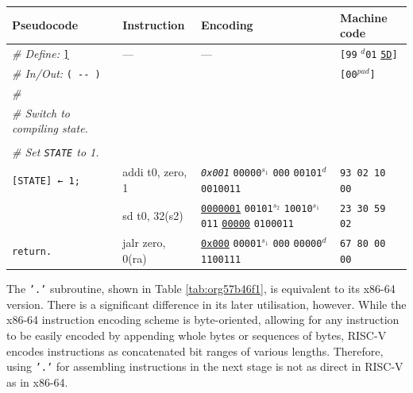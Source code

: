 \documentclass[a4paper,12pt,final]{article}
\begin{document}
\begin{table}[!htbp] \begin{adjustwidth}{-1cm}{-1cm} \fontsize{8}{9.600000}\selectfont
\begin{center}
\begin{tabular}{l|ll|l}
\textbf{Pseudocode} & \textbf{Instruction} & \textbf{Encoding} & \textbf{Machine code}\\[0pt]
\hline
\emph{\# Define:} \uline{\texttt{]}} & --- & --- & \texttt{[99} \(^{d}\)​\texttt{01} \uline{\texttt{5D}}​\texttt{]}\\[0pt]
\emph{\# In/Out:} \texttt{( -​- )} &  &  & \texttt{[00}​\(^{pad}\)​\texttt{]}\\[0pt]
\emph{\#} &  &  & \\[0pt]
\emph{\# Switch to compiling state.} &  &  & \\[0pt]
 &  &  & \\[0pt]
\emph{\# Set \texttt{STATE} to 1.} &  &  & \\[0pt]
\texttt{[STATE] ← 1;} & addi t0, zero, 1 & \emph{\texttt{0x001}}                    \texttt{00000}​\(^{s_{1}}\) \texttt{000} \texttt{00101}​\(^{d}\)  \texttt{0010011} & \texttt{93 02 10 00}\\[0pt]
 & sd t0, 32(s2) & \uline{\texttt{0000001}} \texttt{00101}​\(^{s_{2}}\) \texttt{10010}​\(^{s_{1}}\) \texttt{011} \uline{\texttt{00000}} \texttt{0100011} & \texttt{23 30 59 02}\\[0pt]
\texttt{return.} & jalr zero, 0(ra) & \uline{\texttt{0x000}}                    \texttt{00001}​\(^{s_{1}}\) \texttt{000} \texttt{00000}​\(^{d}\)  \texttt{1100111} & \texttt{67 80 00 00}\\[0pt]
\end{tabular}
\captionof{table}{\label{tab:orgba3694e}Subroutine \texttt{']'} changes Forth's \texttt{STATE} back to compiling (RISC-V).}

\end{center}
\normalsize \end{adjustwidth} \end{table} \vspace{0}

The \texttt{'.'} subroutine, shown in Table \ref{tab:org57b46f1}, is equivalent to
its x86-64 version.  There is a significant difference in its later
utilisation, however.  While the x86-64 instruction encoding scheme is
byte-oriented, allowing for any instruction to be easily encoded by
appending whole bytes or sequences of bytes, RISC-V encodes
instructions as concatenated bit ranges of various lengths.
Therefore, using \texttt{'.'} for assembling instructions in the next stage
is not as direct in RISC-V as in x86-64.
\end{document}
